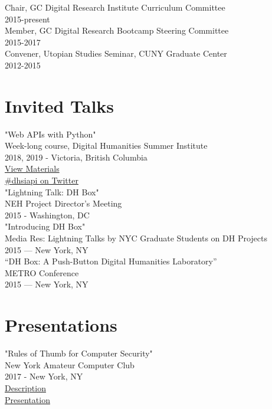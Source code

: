 \documentclass[11pt]{article}
\begin{document}
Chair, GC Digital Research Institute Curriculum Committee\\
2015-present\\

Member, GC Digital Research Bootcamp Steering Committee\\
2015-2017\\

Convener, Utopian Studies Seminar, CUNY Graduate Center\\
2012-2015\\
\section*{Invited Talks}
\label{sec:orgheadline6}
"Web APIs with Python"\\
Week-long course, Digital Humanities Summer Institute\\
2018, 2019 - Victoria, British Columbia\\
\href{https://github.com/szweibel/DHSI-API-workshop#web-apis-with-python}{View Materials}\\
\href{https://twitter.com/search?q=\%2523dhsiapi&src=typd}{\#dhsiapi on Twitter}\\

"Lightning Talk: DH Box"\\
NEH Project Director's Meeting\\
2015 - Washington, DC\\

"Introducing DH Box"\\
Media Res: Lightning Talks by NYC Graduate Students on DH Projects\\
2015 — New York, NY\\

“DH Box: A Push-Button Digital Humanities Laboratory”\\
METRO Conference\\
2015 — New York, NY\\

\section*{Presentations}
\label{sec:orgheadline7}
"Rules of Thumb for Computer Security"\\
New York Amateur Computer Club\\
2017 - New York, NY\\
\href{http://nyacc.org/}{Description}\\
\href{http://htmlpreview.github.io/?https://github.com/smythp/security-workshop/blob/master/presentation/index.html#/sec-title-slide}{Presentation}\\
\end{document}
